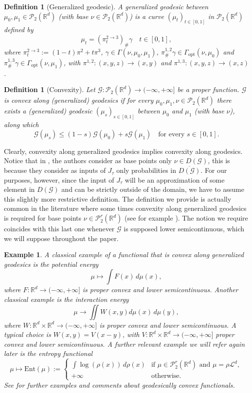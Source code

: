 \documentclass[11pt]{article}
\newtheorem{defi}[theorem]{Definition}
\newtheorem*{example}{Example}
\newcommand{\cP}{\mathcal{P}}
\newcommand{\cG}{\mathcal{G}}
\newcommand{\R}{\mathbb{R}}
\newcommand{\RR}{(-\infty,+\infty]}
\numberwithin{equation}{section}
\begin{document}
\begin{defi}[Generalized geodesic]
	A generalized geodesic between $\mu_0,\mu_1\in \cP_2(\R^d)$ (with base $\nu\in \cP_2(\R^d)$) is a curve $(\mu_t)_{t\in [0,1]}$ in $\cP_2(\R^d)$  defined by
	\[\mu_t = (\pi_t^{2\to 3})_{\#} \gamma \quad t\in [0,1],\]
	where $\pi_t^{2\to 3}:= (1-t)\pi^2+t\pi^3$, $\gamma \in \Gamma(\nu,\mu_0,\mu_1)$, $\pi_{\#}^{1,2}\gamma \in \Gamma_{\text{opt}}(\nu,\mu_0)$ and $\pi_{\#}^{1,3}\gamma \in \Gamma_{\text{opt}}(\nu,\mu_1)$, with $\pi^{1,2}:(x,y,z)\to (x,y)$ and $\pi^{1,3}:(x,y,z)\to (x,z)$.
\end{defi}

\begin{defi}[Convexity]
	Let $\cG: \cP_2(\R^d) \to (-\infty,+\infty]$ be a proper function. $\cG$ is convex along (generalized) geodesics if for every $\mu_0,\mu_1, \nu \in \cP_2(\R^d)$ there exists a  (generalized) geodesic $(\mu_s)_{s\in[0,1]}$ between $\mu_0$ and $\mu_1$ (with base $\nu$), along which
	\begin{equation}
		\cG(\mu_s)\leq (1-s)\cG(\mu_0)+s\cG(\mu_1) \quad \text{for every } s \in [0,1].
	\end{equation}
\end{defi}

Clearly, convexity along generalized geodesics implies convexity along geodesics. Notice that in \cite[Definition 9.2.4]{AGS08}, the authors consider as base points only $\nu\in D(\cG)$, this is because they consider as inputs of $J_{\tau}$ only probabilities in $\overline{D(\cG)}$. For our purposes, however, since the input of $J_{\tau}$ will be an approximation of some element in $D(\cG)$ and can be strictly outside of the domain, we have to assume this slightly more restrictive definition. The definition we provide is actually common in the literature where some times convexity along generalized geodesics is required for base points $\nu\in \cP_2^r(\R^d)$ (see for example \cite[Section 2.3.2]{WPG2020}). The notion we require coincides with this last one whenever $\cG$ is supposed lower semicontinuous, which we will suppose throughout the paper.

\begin{example}
	A classical example of a functional that is convex along generalized geodesics is the potential energy \[\mu \mapsto \int F(x) \, d\mu(x),\]
	where $F:\R^d \to \RR$ is proper convex and lower semicontinuous. Another classical example is the interaction energy \[\mu \to \iint W(x,y) d\mu(x) \, d\mu(y),\]
	where $W: \R^d\times\R^d\to \RR$ is proper convex and lower semicontinuous. A typical choice is $W(x,y)=V(x-y)$, with $V:\R^d\times\R^d\to \RR$ proper convex and lower semicontinuous. A further relevant example we will refer again later is the entropy functional
	\[\mu \mapsto \text{Ent}(\mu):=\begin{cases}\int \log(\rho(x))\, d\rho(x) & \text{if } \mu\in \cP_2^r(\R^d) \text{ and } \mu = \rho \mathcal{L}^d,\\
		+\infty & \text{otherwise.}\end{cases}\]
	See \cite[Section 9.3 and 9.4]{AGS08} for further examples and comments about geodesically convex functionals. 
\end{example}
\end{document}
